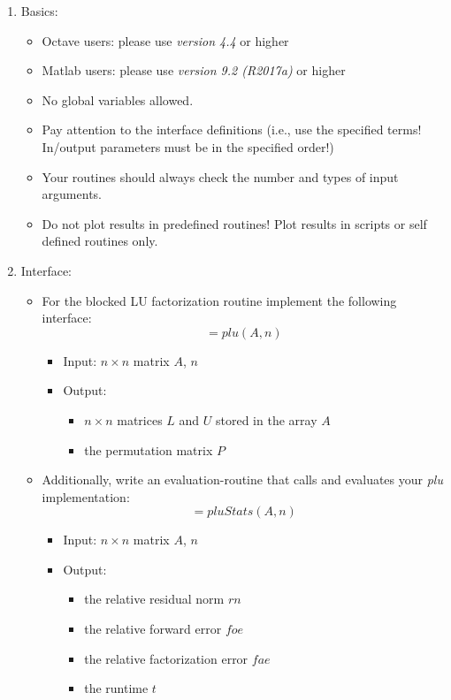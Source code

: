 \documentclass{scrartcl}
\begin{document}
\begin{enumerate}
	\item Basics:
	\begin{itemize}
		\item Octave users: please use \textit{version 4.4} or higher
		\item Matlab users: please use \textit{version 9.2 (R2017a)} or higher 
		\item No global variables allowed.
		\item Pay attention to the interface definitions (i.e., use the specified terms! In/output parameters must be in the specified order!)
		\item Your routines should always check the number and types of input arguments.
		\item Do not plot results in predefined routines! Plot results in scripts or self defined routines only.
	\end{itemize}
	\item Interface:
	\begin{itemize}
		\item For the blocked LU factorization routine implement the following interface:
		\begin{equation*}
			[A, P] = plu(A, n)
		\end{equation*}
		
		\begin{itemize}
			\item Input: $n \times n$ matrix $A$, $n$
			\item Output: 
			\begin{itemize}
				\item $n \times n$ matrices $L$ and $U$ stored in the array $A$
				\item the permutation matrix $P$
			\end{itemize}
		\end{itemize}
		
		\item Additionally, write an evaluation-routine that calls and evaluates your \textit{plu} implementation:
		\begin{equation*}
			[rn, foe, fae, t] = pluStats(A, n)
		\end{equation*}

		\begin{itemize}
			\item Input: $n \times n$ matrix $A$, $n$
			\item Output: 
			\begin{itemize}
				\item the relative residual norm $rn$
				\item the relative forward error $foe$
				\item the relative factorization error $fae$
				\item the runtime $t$
			\end{itemize}
		\end{itemize}
		

\end{itemize}
\end{enumerate}
\end{document}
